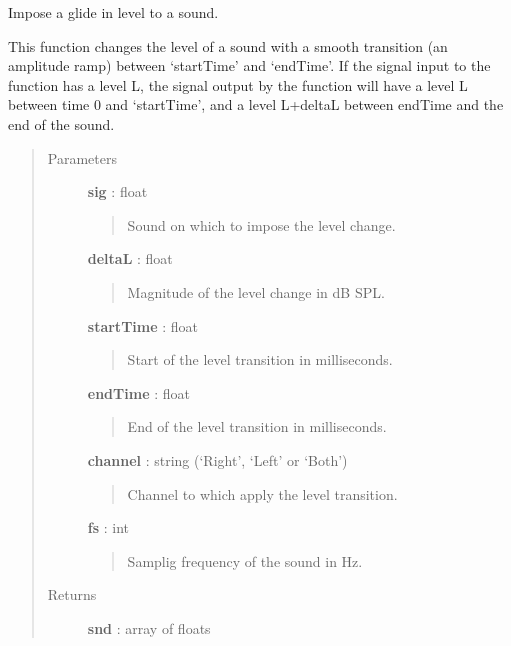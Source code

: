 \documentclass[a4paper,12pt,english]{sphinxmanual}
\begin{document}
\begin{fulllineitems}
\label{sndlib:sndlib.imposeLevelGlide}
Impose a glide in level to a sound.

This function changes the level of a sound with a smooth transition (an amplitude
ramp) between `startTime' and `endTime'. If the signal input to the function
has a level L, the signal output by the function will have a level L
between time 0 and `startTime', and a level L+deltaL between endTime and
the end of the sound.
\begin{quote}\begin{description}
\item[{Parameters }] \leavevmode
\textbf{sig} : float
\begin{quote}

Sound on which to impose the level change.
\end{quote}

\textbf{deltaL} : float
\begin{quote}

Magnitude of the level change in dB SPL.
\end{quote}

\textbf{startTime} : float
\begin{quote}

Start of the level transition in milliseconds.
\end{quote}

\textbf{endTime} : float
\begin{quote}

End of the level transition in milliseconds.
\end{quote}

\textbf{channel} : string (`Right', `Left' or `Both')
\begin{quote}

Channel to which apply the level transition.
\end{quote}

\textbf{fs} : int
\begin{quote}

Samplig frequency of the sound in Hz.
\end{quote}

\item[{Returns }] \leavevmode
\textbf{snd} : array of floats

\end{description}\end{quote}

\end{fulllineitems}
\end{document}
